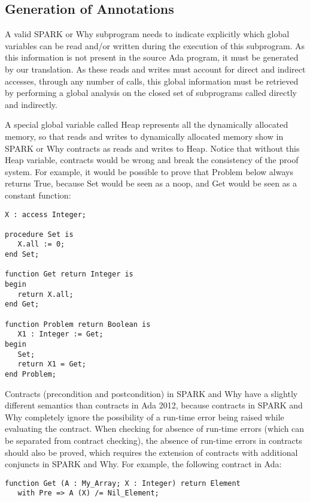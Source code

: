 \documentclass{article}
\begin{document}
\subsection{Generation of Annotations}

A valid SPARK or Why subprogram needs to indicate explicitly which global
variables can be read and/or written during the execution of this
subprogram. As this information is not present in the source Ada program, it
must be generated by our translation. As these reads and writes must account
for direct and indirect accesses, through any number of calls, this global
information must be retrieved by performing a global analysis on the closed set
of subprograms called directly and indirectly.

A special global variable called Heap represents all the dynamically allocated
memory, so that reads and writes to dynamically allocated memory show in SPARK
or Why contracts as reads and writes to Heap. Notice that without this Heap
variable, contracts would be wrong and break the consistency of the proof
system. For example, it would be possible to prove that Problem below always
returns True, because Set would be seen as a noop, and Get would be seen as a
constant function:

\begin{verbatim}
X : access Integer;

procedure Set is
   X.all := 0;
end Set;

function Get return Integer is
begin
   return X.all;
end Get;

function Problem return Boolean is
   X1 : Integer := Get;
begin
   Set;
   return X1 = Get;
end Problem;
\end{verbatim}

Contracts (precondition and postcondition) in SPARK and Why have a
slightly different semantics than contracts in Ada 2012, because contracts in
SPARK and Why completely ignore the possibility of a run-time error being
raised while evaluating the contract. When checking for absence of run-time
errors (which can be separated from contract checking), the absence of run-time
errors in contracts should also be proved, which requires the extension of
contracts with additional conjuncts in SPARK and Why. For example, the
following contract in Ada:

\begin{verbatim}
function Get (A : My_Array; X : Integer) return Element
   with Pre => A (X) /= Nil_Element;
\end{verbatim}
\end{document}
